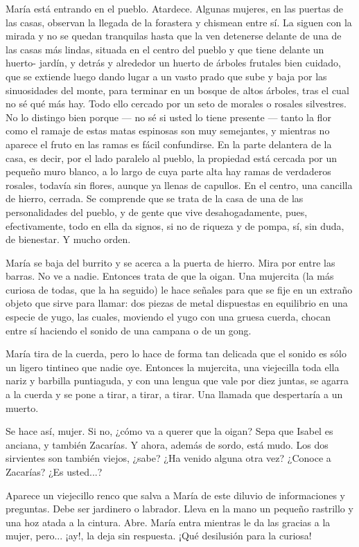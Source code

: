 \documentclass[12pt, twoside, openright]{book} %
\begin{document}
María está entrando en el pueblo. Atardece. Algunas mujeres, en las puertas de las casas, observan la llegada de la forastera y chismean entre sí. La siguen con la mirada y no se quedan tranquilas hasta que la ven detenerse delante de una de las casas más lindas, situada en el centro del pueblo y que tiene delante un huerto- jardín, y detrás y alrededor un huerto de árboles frutales bien cuidado, que se extiende luego dando lugar a un vasto prado que sube y baja por las sinuosidades del monte, para terminar en un bosque de altos árboles, tras el cual no sé qué más hay. Todo ello cercado por un seto de morales o rosales silvestres. No lo distingo bien porque — no sé si usted lo tiene presente — tanto la flor como el ramaje de estas matas espinosas son muy semejantes, y mientras no aparece el fruto en las ramas es fácil confundirse. En la parte delantera de la casa, es decir, por el lado paralelo al pueblo, la propiedad está cercada por un pequeño muro blanco, a lo largo de cuya parte alta hay ramas de verdaderos rosales, todavía sin flores, aunque ya llenas de capullos. En el centro, una cancilla de hierro, cerrada. Se comprende que se trata de la casa de una de las personalidades del pueblo, y de gente que vive desahogadamente, pues, efectivamente, todo en ella da signos, si no de riqueza y de pompa, sí, sin duda, de bienestar. Y mucho orden. 

María se baja del burrito y se acerca a la puerta de hierro. Mira por entre las barras. No ve a nadie. Entonces trata de que la oigan. Una mujercita (la más curiosa de todas, que la ha seguido) le hace señales para que se fije en un extraño objeto que sirve para llamar: dos piezas de metal dispuestas en equilibrio en una especie de yugo, las cuales, moviendo el yugo con una gruesa cuerda, chocan entre sí haciendo el sonido de una campana o de un gong. 

María tira de la cuerda, pero lo hace de forma tan delicada que el sonido es sólo un ligero tintineo que nadie oye. Entonces la mujercita, una viejecilla toda ella nariz y barbilla puntiaguda, y con una lengua que vale por diez juntas, se agarra a la cuerda y se pone a tirar, a tirar, a tirar. Una llamada que despertaría a un muerto. 

Se hace así, mujer. Si no, ¿cómo va a querer que la oigan? Sepa que Isabel es anciana, y también Zacarías. Y ahora, además de sordo, está mudo. Los dos sirvientes son también viejos, ¿sabe? ¿Ha venido alguna otra vez? ¿Conoce a Zacarías? ¿Es usted...? 

Aparece un viejecillo renco que salva a María de este diluvio de informaciones y preguntas. Debe ser jardinero o labrador. Lleva en la mano un pequeño rastrillo y una hoz atada a la cintura. Abre. María entra mientras le da las gracias a la mujer, pero... ¡ay!, la deja sin respuesta. ¡Qué desilusión para la curiosa! 
\end{document}
